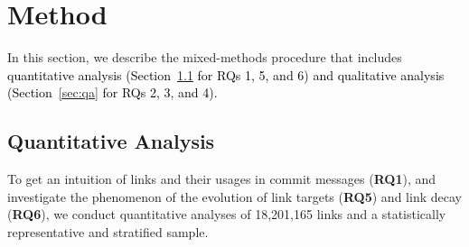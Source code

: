 \documentclass[smallextended]{svjour3}       %
\newcommand{\fix}[1]{\textcolor{black}{#1}}
\begin{document}



\section{Method}
\label{sec:md}
In this section, we describe the mixed-methods procedure that includes \fix{quantitative analysis (Section~\ref{sec:qan} for RQs 1, 5, and 6) and qualitative analysis (Section~\ref{sec:qa} for RQs 2, 3, and 4).}

\subsection{Quantitative Analysis}
\label{sec:qan}
To get an intuition of links and their usages in commit messages (\textbf{RQ1}), and investigate the phenomenon of the evolution of link targets (\textbf{RQ5}) and link decay (\textbf{RQ6}), we conduct quantitative analyses of 18,201,165 links and a statistically representative and stratified
sample.
\end{document}
